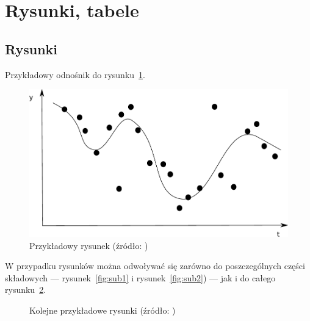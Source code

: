 \documentclass[polish]{aghengthesis}
\begin{document}

\section{Rysunki, tabele}
\label{sec:rysunki-tabele}

\subsection{Rysunki}
\label{sec:rysunki}

Przykładowy odnośnik do rysunku~\ref{fig:ex1}.

\begin{figure}[!htbp]
  \centering
\includegraphics[width=.7\textwidth]{resources/example.pdf}
\caption[Przykładowy rysunek]{Przykładowy rysunek (źródło:
  \cite{author2021title})}
\label{fig:ex1}
\end{figure}
 
W przypadku rysunków można odwoływać się zarówno do poszczególnych części
składowych --- rysunek~\ref{fig:sub1} i rysunek~\ref{fig:sub2}) --- jak i do
całego rysunku~\ref{fig:ex2}.

\begin{figure}[!htbp]
\begin{center}
%
\end{center}
\caption[Kolejne przykładowe rysunki]{Kolejne przykładowe rysunki (źródło:
  \cite{author2021title})}
\label{fig:ex2}
\end{figure}
\end{document}
